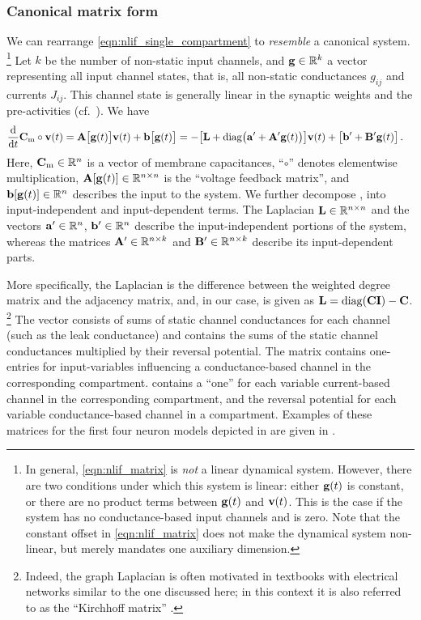 \subsubsection{Canonical matrix form}
We can rearrange \cref{eqn:nlif_single_compartment} to \emph{resemble} a canonical \LTI system.%
\footnote{
In general, \cref{eqn:nlif_matrix} is \emph{not} a linear dynamical system.
However, there are two conditions under which this system is linear: either $\mathbf{g}(t)$ is constant, or there are no product terms between $\mathbf{g}(t)$ and ${\mathbf{v}}(t)$.
This is the case if the system has no conductance-based input channels and \mnAp is zero.
Note that the constant offset \vnbp in \cref{eqn:nlif_matrix} does not make the dynamical system non-linear, but merely mandates one auxiliary dimension.
}
Let $k$ be the number of non-static input channels, and $\mathbf{g} \in \mathbb{R}^k$ a vector representing all input channel states, that is, all non-static conductances $g_{ij}$ and currents $J_{ij}$.
This channel state is generally linear in the synaptic weights and the pre-activities (cf.~).
We have
\begin{align}
	\frac{\mathrm{d}}{\mathrm{d}t} {{\mathbf{C}}_\mathrm{m}} \circ {\ensuremath{\mathbf{v}}}(t)
	&= \mathbf{A}\bigl[\mathbf{g}(t)\bigr] {\ensuremath{\mathbf{v}}}(t) + \mathbf{b}\bigl[\mathbf{g}(t)\bigr]
	 = -\bigl[\mathbf{L} + \mathrm{diag}\bigl(\mathbf{a}' + \mathbf{A}' \mathbf{g}(t)\bigr)\bigr] {\ensuremath{\mathbf{v}}}(t) + \big[\mathbf{b}' + \mathbf{B}' \mathbf{g}(t)\big] \,.
	\label{eqn:nlif_matrix}
\end{align}
Here, ${{\mathbf{C}}_\mathrm{m}} \in \mathbb{R}^n$ is a vector of membrane capacitances, \enquote{$\circ$} denotes elementwise multiplication, $\mathbf{A}[\mathbf{g}(t)] \in \mathbb{R}^{n \times n}$ is the \enquote{voltage feedback matrix}, and $\mathbf{b}[\mathbf{g}(t)] \in \mathbb{R}^n$ describes the input to the system.
We further decompose \mnA, \vnb into input-independent and input-dependent terms.
The Laplacian $\mathbf{L} \in \mathbb{R}^{n \times n}$ and the vectors $\mathbf{a}' \in \mathbb{R}^n$, $\mathbf{b}' \in \mathbb{R}^n$ describe the input-independent portions of the system, whereas the matrices $\mathbf{A}' \in \mathbb{R}^{n \times k}$ and $\mathbf{B}' \in \mathbb{R}^{n \times k}$ describe its input-dependent parts.

More specifically, the Laplacian \mnL is the difference between the weighted degree matrix and the adjacency matrix, and, in our case, is given as $\mathbf{L} = \operatorname{\mathrm{diag}}(\mathbf{C} \mathbf{I}) - \mathbf{C}$.%
\footnote{Indeed, the graph Laplacian is often motivated in textbooks with electrical networks similar to the one discussed here; in this context it is also referred to as the \enquote{Kirchhoff matrix} \citep[e.g.,][Chapter~2]{bollobas1998modern}.}
The vector \vnap consists of sums of static channel conductances for each channel (such as the leak conductance) and \vnbp contains the sums of the static channel conductances multiplied by their reversal potential.
The matrix \mnAp contains one-entries for input-variables influencing a conductance-based channel in the corresponding compartment.
\mnBp contains a \enquote{one} for each variable current-based channel in the corresponding compartment, and the reversal potential for each variable conductance-based channel in a compartment.
Examples of these matrices for the first four \nlif neuron models depicted in  are given in .

